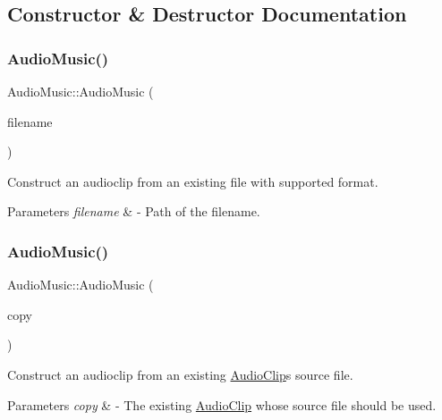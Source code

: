 \subsection{Constructor \& Destructor Documentation}
\mbox{\label{class_audio_music_a260b6ddf241e3f1e865a49309aa12572}} 
\subsubsection{\texorpdfstring{Audio\+Music()}{AudioMusic()}\hspace{0.1cm}{\footnotesize\ttfamily [1/3]}}
{\footnotesize\ttfamily Audio\+Music\+::\+Audio\+Music (\begin{DoxyParamCaption}\item[{std\+::string}]{filename }\end{DoxyParamCaption})}

Construct an audioclip from an existing file with supported format. 
\begin{DoxyParams}{Parameters}
{\em filename} & -\/ Path of the filename. \\
\hline
\end{DoxyParams}
\mbox{\label{class_audio_music_a742e8a6822342b8de08175e3948e5830}} 
\subsubsection{\texorpdfstring{Audio\+Music()}{AudioMusic()}\hspace{0.1cm}{\footnotesize\ttfamily [2/3]}}
{\footnotesize\ttfamily Audio\+Music\+::\+Audio\+Music (\begin{DoxyParamCaption}\item[{const \mbox{\hyperlink{class_audio_music}{Audio\+Music}} \&}]{copy }\end{DoxyParamCaption})}

Construct an audioclip from an existing \mbox{\hyperlink{class_audio_clip}{Audio\+Clip}}\textquotesingle{}s source file. 
\begin{DoxyParams}{Parameters}
{\em copy} & -\/ The existing \mbox{\hyperlink{class_audio_clip}{Audio\+Clip}} whose source file should be used. \\
\hline
\end{DoxyParams}
\mbox{\label{class_audio_music_a55779c2cc75a89cf808d92e313d80ae8}} 
